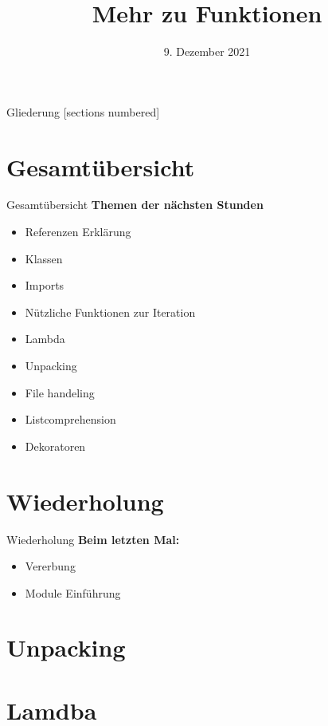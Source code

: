 



\title{Mehr zu Funktionen}
\date{9. Dezember 2021}


	
\maketitle

\begin{frame}{Gliederung}
	[sections numbered]
	\tableofcontents
\end{frame}

\section*{Gesamtübersicht}
\begin{frame}{Gesamtübersicht}
	\textbf{Themen der nächsten Stunden}
	\begin{itemize}
		\item Referenzen Erklärung
		\item  Klassen
		\item Imports
		\item Nützliche Funktionen zur Iteration
		\item \alert{Lambda}
		\item \alert{Unpacking}
		\item File handeling
		\item Listcomprehension
		\item Dekoratoren
	\end{itemize}
\end{frame}

\section{Wiederholung}
\begin{frame}{Wiederholung}
	\textbf{Beim letzten Mal:}
	\begin{itemize}
		\item Vererbung
		
		\item Module Einführung
		
	\end{itemize}	
\end{frame}

\section{Unpacking}

\begin{frame}{}

\end{frame}

\section{Lamdba}

\begin{frame}{}

\end{frame}


